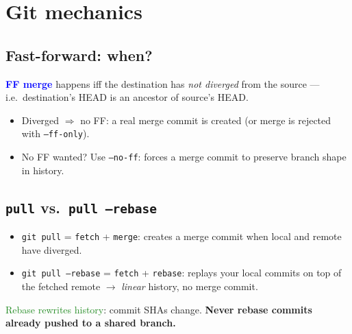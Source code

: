 \section{Git mechanics}

\subsection{Fast-forward: when?}
\textcolor{Blue}{\textbf{FF merge}} happens iff the destination has \emph{not diverged} from the source — i.e.\ destination's HEAD is an ancestor of source's HEAD.
\begin{itemize}
  \item \textcolor{Bittersweet}{Diverged $\Rightarrow$ no FF}: a real merge commit is created (or merge is rejected with \texttt{--ff-only}).
  \item \textcolor{Bittersweet}{No FF wanted? Use \texttt{--no-ff}}: forces a merge commit to preserve branch shape in history.
\end{itemize}

\subsection{\texttt{pull} vs.\ \texttt{pull --rebase}}
\begin{itemize}
  \item \textcolor{Bittersweet}{\texttt{git pull}} = \texttt{fetch} + \texttt{merge}: creates a merge commit when local and remote have diverged.
  \item \textcolor{Bittersweet}{\texttt{git pull --rebase}} = \texttt{fetch} + \texttt{rebase}: replays your local commits on top of the fetched remote $\to$ \emph{linear} history, no merge commit.
\end{itemize}
\textcolor{ForestGreen}{Rebase rewrites history}: commit SHAs change. \textbf{Never rebase commits already pushed to a shared branch.}


